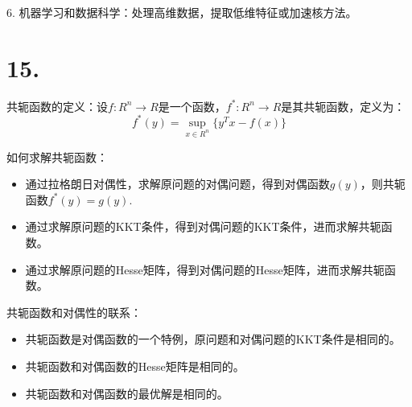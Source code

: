 \documentclass{article}
\begin{document}
    6. 机器学习和数据科学：处理高维数据，提取低维特征或加速核方法。

    \section*{15.}

    共轭函数的定义：设$f: R^n \to R$是一个函数，$f^*: R^n \to R$是其共轭函数，定义为：
    \begin{equation*}
        f^*(y) = \sup_{x \in R^n} \{ y^T x - f(x) \}
    \end{equation*}

    如何求解共轭函数：
    \begin{itemize}
        \item 通过拉格朗日对偶性，求解原问题的对偶问题，得到对偶函数$g(y)$，则共轭函数$f^*(y) = g(y)$.
        \item 通过求解原问题的KKT条件，得到对偶问题的KKT条件，进而求解共轭函数。
        \item 通过求解原问题的Hesse矩阵，得到对偶问题的Hesse矩阵，进而求解共轭函数。
    \end{itemize}

    共轭函数和对偶性的联系：
    \begin{itemize}
        \item 共轭函数是对偶函数的一个特例，原问题和对偶问题的KKT条件是相同的。
        \item 共轭函数和对偶函数的Hesse矩阵是相同的。
        \item 共轭函数和对偶函数的最优解是相同的。
    \end{itemize}
\end{document}
